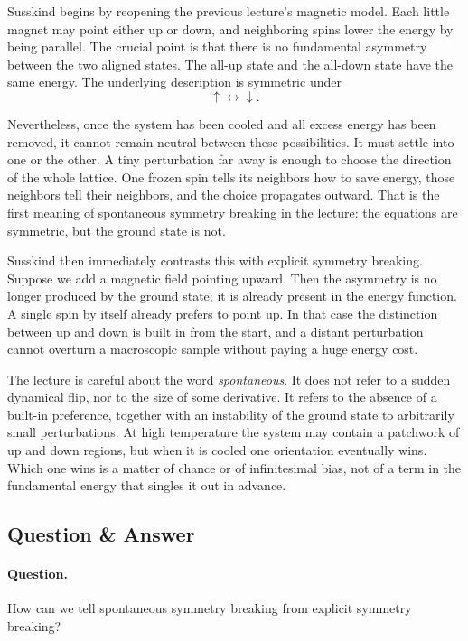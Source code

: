 Susskind begins by reopening the previous lecture's magnetic model. Each little magnet may point either up or down, and neighboring spins lower the energy by being parallel. The crucial point is that there is no fundamental asymmetry between the two aligned states. The all-up state and the all-down state have the same energy. The underlying description is symmetric under
\[
\uparrow \longleftrightarrow \downarrow.
\]

Nevertheless, once the system has been cooled and all excess energy has been removed, it cannot remain neutral between these possibilities. It must settle into one or the other. A tiny perturbation far away is enough to choose the direction of the whole lattice. One frozen spin tells its neighbors how to save energy, those neighbors tell their neighbors, and the choice propagates outward. That is the first meaning of spontaneous symmetry breaking in the lecture: the equations are symmetric, but the ground state is not.

Susskind then immediately contrasts this with explicit symmetry breaking. Suppose we add a magnetic field pointing upward. Then the asymmetry is no longer produced by the ground state; it is already present in the energy function. A single spin by itself already prefers to point up. In that case the distinction between up and down is built in from the start, and a distant perturbation cannot overturn a macroscopic sample without paying a huge energy cost.

The lecture is careful about the word \emph{spontaneous}. It does not refer to a sudden dynamical flip, nor to the size of some derivative. It refers to the absence of a built-in preference, together with an instability of the ground state to arbitrarily small perturbations. At high temperature the system may contain a patchwork of up and down regions, but when it is cooled one orientation eventually wins. Which one wins is a matter of chance or of infinitesimal bias, not of a term in the fundamental energy that singles it out in advance.

\subsection{Question \& Answer}

\paragraph{Question.} How can we tell spontaneous symmetry breaking from explicit symmetry breaking?

